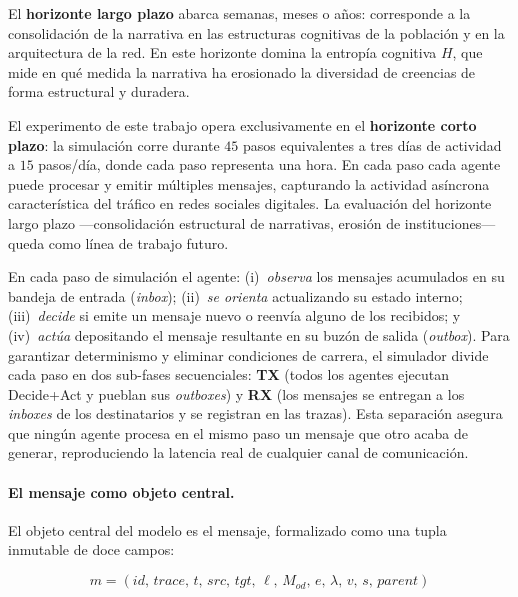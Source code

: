 El \textbf{horizonte largo plazo} abarca semanas, meses o años: corresponde a la consolidación de la narrativa en las estructuras cognitivas de la población y en la arquitectura de la red.
En este horizonte domina la entropía cognitiva $H$, que mide en qué medida la narrativa ha erosionado la diversidad de creencias de forma estructural y duradera.

El experimento de este trabajo opera exclusivamente en el \textbf{horizonte corto plazo}: la simulación corre durante $45$ pasos equivalentes a tres días de actividad a $15$ pasos/día, donde cada paso representa una hora.
En cada paso cada agente puede procesar y emitir múltiples mensajes, capturando la actividad asíncrona característica del tráfico en redes sociales digitales.
La evaluación del horizonte largo plazo ---consolidación estructural de narrativas, erosión de instituciones--- queda como línea de trabajo futuro.

En cada paso de simulación el agente: (i)~\emph{observa} los mensajes acumulados en su bandeja de entrada (\emph{inbox}); (ii)~\emph{se orienta} actualizando su estado interno; (iii)~\emph{decide} si emite un mensaje nuevo o reenvía alguno de los recibidos; y (iv)~\emph{actúa} depositando el mensaje resultante en su buzón de salida (\emph{outbox}).
Para garantizar determinismo y eliminar condiciones de carrera, el simulador divide cada paso en dos sub-fases secuenciales: \textbf{TX} (todos los agentes ejecutan Decide+Act y pueblan sus \emph{outboxes}) y \textbf{RX} (los mensajes se entregan a los \emph{inboxes} de los destinatarios y se registran en las trazas).
Esta separación asegura que ningún agente procesa en el mismo paso un mensaje que otro acaba de generar, reproduciendo la latencia real de cualquier canal de comunicación.

\paragraph{El mensaje como objeto central.}
El objeto central del modelo es el mensaje, formalizado como una tupla inmutable de doce campos:

\begin{equation}
m = (id,\, trace,\, t,\, src,\, tgt,\, \ell,\, M_{od},\, e,\, \lambda,\, v,\, s,\, parent)
\label{eq:mensaje}
\end{equation}

